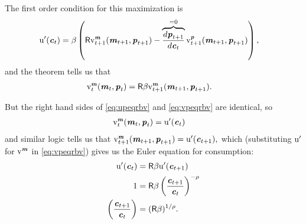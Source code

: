 \documentclass{scrartcl}
\begin{document}
The first order condition for this maximization is
\begin{equation}\begin{gathered}\begin{aligned}
        \mathrm{u}^{\prime}(\boldsymbol{\mathit{c}}_{t}) & =  \beta \left(\mathsf{R} \mathrm{v}_{t+1}^{\boldsymbol{\mathit{m}}}(\boldsymbol{\mathit{m}}_{t+1},\boldsymbol{\mathit{p}}_{t+1})-\overbrace{\frac{d\boldsymbol{\mathit{p}}_{t+1}}{d \boldsymbol{\mathit{c}}_{t}}}^{=0}\mathrm{v}_{t+1}^{\boldsymbol{\mathit{p}}}(\boldsymbol{\mathit{m}}_{t+1},\boldsymbol{\mathit{p}}_{t+1})\right), \label{eq:upeqrbv}
\end{aligned}\end{gathered}\end{equation}
and the  theorem tells us that
\begin{equation}\begin{gathered}\begin{aligned}
        \mathrm{v}_{t}^{\boldsymbol{\mathit{m}}}(\boldsymbol{\mathit{m}}_{t},\boldsymbol{\mathit{p}}_{t}) & =  \mathsf{R} \beta \mathrm{v}_{t+1}^{\boldsymbol{\mathit{m}}}(\boldsymbol{\mathit{m}}_{t+1},\boldsymbol{\mathit{p}}_{t+1}). \label{eq:vpeqrbv}
\end{aligned}\end{gathered}\end{equation}

But the right hand sides of \eqref{eq:upeqrbv} and \eqref{eq:vpeqrbv} 
are identical, so
\begin{equation}\begin{gathered}\begin{aligned}
        \mathrm{v}_{t}^{\boldsymbol{\mathit{m}}}(\boldsymbol{\mathit{m}}_{t},\boldsymbol{\mathit{p}}_{t}) & =  \mathrm{u}^{\prime}(\boldsymbol{\mathit{c}}_{t})
\end{aligned}\end{gathered}\end{equation}
and similar logic tells us that $\mathrm{v}_{t+1}^{\boldsymbol{\mathit{m}}}(\boldsymbol{\mathit{m}}_{t+1},\boldsymbol{\mathit{p}}_{t+1})=\mathrm{u}^{\prime}(\boldsymbol{\mathit{c}}_{t+1}),$ which 
(substituting $\mathrm{u}^{\prime}$ for $\mathrm{v}^{\boldsymbol{\mathit{m}}}$ in \eqref{eq:vpeqrbv}) gives us the \hypertarget{EulerCGroFac}{Euler 
equation for consumption}:
\begin{equation}\begin{gathered}\begin{aligned}
        \mathrm{u}^{\prime}(\boldsymbol{\mathit{c}}_{t}) & =  \mathsf{R}\beta \mathrm{u}^{\prime}(\boldsymbol{\mathit{c}}_{t+1}) \\
        1 & =  \mathsf{R}\beta \left(\frac{\boldsymbol{\mathit{c}}_{t+1}}{\boldsymbol{\mathit{c}}_{t}}\right)^{-\rho}
\\  \left(\frac{\boldsymbol{\mathit{c}}_{t+1}}{\boldsymbol{\mathit{c}}_{t}}\right) & =  (\mathsf{R}\beta)^{1/\rho} \label{eq:cgrow}
.
\end{aligned}\end{gathered}\end{equation}
\end{document}
